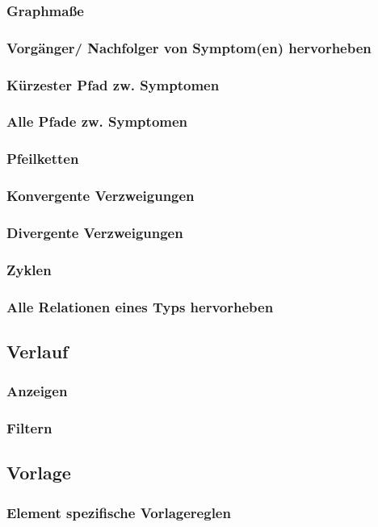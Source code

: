 \documentclass[enabledeprecatedfontcommands,fontsize=11pt,paper=a4,twoside]{scrartcl}
\newcounter{one}
\begin{document}
		\subsubsection{Graphmaße} 
		\subsubsection{Vorgänger/ Nachfolger von Symptom(en) hervorheben}
		\subsubsection{Kürzester Pfad zw. Symptomen}
		\subsubsection{Alle Pfade zw. Symptomen}
		\subsubsection{Pfeilketten}
		\subsubsection{Konvergente Verzweigungen}
		\subsubsection{Divergente Verzweigungen}
		\subsubsection{Zyklen}
		\subsubsection{Alle Relationen eines Typs hervorheben}		
	\subsection{Verlauf} \label{logs}
		\subsubsection{Anzeigen}
		\subsubsection{Filtern}
	\subsection{Vorlage} \label{template}
		\subsubsection{Element spezifische Vorlagereglen}
\end{document}
